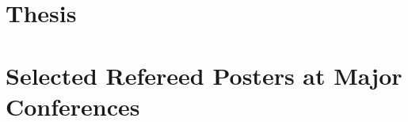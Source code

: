 \documentclass{article}
\begin{document}
\begin{refsegment}
  \nocite{las-2004-gridant}
  \nocite{las-2004-clade}
  \nocite{las-2004-adcom}
  \nocite{las-2004-abstracting}
  \nocite{las-2004-qos-ccgrid}

  \nocite{las-2003-reputation}
  \nocite{las-2003-qos}
  \nocite{las-2003-masses}
  \nocite{las-2003-ftp}
  \nocite{las-2003-dc}
  \nocite{las-2003-coalloc}
  \nocite{las-2003-chem}
  
  \nocite{las-2002-vision}
  \nocite{las-2002-pdcs}
  \nocite{las-2002-ocgsa}
  \nocite{las-2002-infogram}
  \nocite{las-2002-gcc}
  \nocite{las-2002-deploy}
  \nocite{las-2002-activetable}
  
  \nocite{las-2001-pse}
  \nocite{las-2001-hpdc-cactus}
  \nocite{las-2001-corba}
  \nocite{las-2001-greedy}  

  \nocite{las-2000-moba}
  \nocite{las-2000-grande}

  \nocite{las-1999-spie}
  \nocite{las-1999-siam}
  \nocite{las-1999-rostock}
  \nocite{las-1998-hpdc}
  \nocite{las-1997-nobugs}
  \nocite{las-1997-hpdc}
  \nocite{las-1996-ecwmf}
  \nocite{las-1994-ecwmf}
  \nocite{las-1992-high}  
  \nocite{las-1991-icga}
  \nocite{las-1990-ppsn}
  \nocite{las-1990-natug}

  
\end{refsegment}


\pbib


\section{Thesis}


\begin{refsegment}

\nocite{las-1996-thesis}

\end{refsegment}

\pbib



\section{Selected Refereed Posters at Major Conferences}
\end{document}
